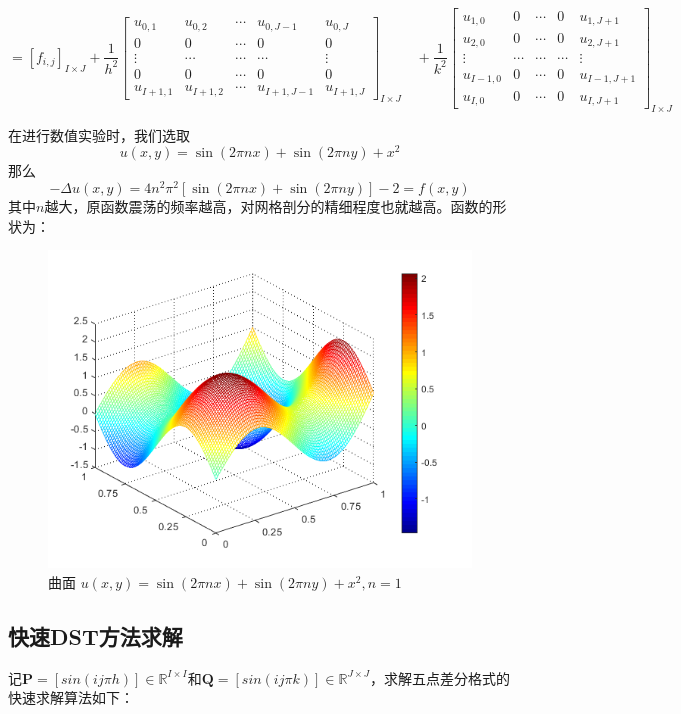 \documentclass[fontset=mac]{ctexart}
\begin{document}
		$$
		=\left[f_{i, j}\right]_{I \times J}+\frac{1}{h^{2}}\left[\begin{array}{ccccc}
			u_{0,1} & u_{0,2} & \cdots & u_{0, J-1} & u_{0, J} \\
			0 & 0 & \cdots & 0 & 0 \\
			\vdots & \cdots & \cdots & \cdots & \vdots \\
			0 & 0 & \cdots & 0 & 0 \\
			u_{I+1,1} & u_{I+1,2} & \cdots & u_{I+1, J-1} & u_{I+1, J}
		\end{array}\right]_{I \times J} \quad+\frac{1}{k^{2}}\left[\begin{array}{ccccc}
			u_{1,0} & 0 & \cdots & 0 & u_{1, J+1} \\
			u_{2,0} & 0 & \cdots & 0 & u_{2, J+1} \\
			\vdots & \cdots & \cdots & \cdots & \vdots \\
			u_{I-1,0} & 0 & \cdots & 0 & u_{I-1, J+1} \\
			u_{I, 0} & 0 & \cdots & 0 & u_{I, J+1}
		\end{array}\right]_{I \times J}
		$$

	在进行数值实验时，我们选取
	$$
	u(x, y)=\sin (2 \pi n x)+\sin (2 \pi n y)+x^{2}
	$$
	那么
	$$
	-\Delta u(x, y)=4 n^{2} \pi^{2}[\sin (2 \pi n x)+\sin (2 \pi n y)]-2=f(x, y)
	$$
	其中$n$越大，原函数震荡的频率越高，对网格剖分的精细程度也就越高。函数的形状为：
	\begin{figure}[H]
		\centering
		\includegraphics[width=0.7\linewidth]{fig/u}
		\caption{曲面 $u(x, y)=\sin (2 \pi n x)+\sin (2 \pi n y)+x^{2}, n=1$}
	\end{figure}
	
	
	\subsection{快速DST方法求解}
	记$\mathbf{P}=[sin(ij\pi h)] \in \mathbb{R}^{I \times I}$和$\mathbf{Q}=[sin(ij\pi k)] \in \mathbb{R}^{J \times J}$，求解五点差分格式的快速求解算法如下：
	
\end{document}
